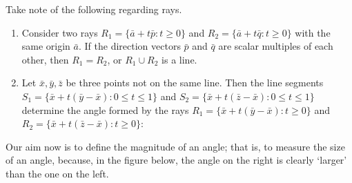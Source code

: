 \begin{remarkbox}
    Take note of the following regarding rays.

    \begin{enumerate}
        \item Consider two rays \(R_1 = \{\bar{a} + t\bar{p} : t \geq 0\}\) and \(R_2 = \{\bar{a} + t\bar{q} : t \geq 0\}\) with the same
origin \(\bar{a}\). If the direction vectors \(\bar{p}\) and \(\bar{q}\) are scalar multiples of each other, then \(R_1 = R_2\), or \(R_1 \cup R_2\) is a line.

        \item Let \(\bar{x}, \bar{y}, \bar{z}\) be three points not on the same line. Then the line segments \\
            \(S_1 = \{\bar{x}+t(\bar{y}-\bar{x}) : 0 \leq t \leq 1\}\) and \(S_2 = \{\bar{x}+t(\bar{z}-\bar{x}) : 0 \leq t \leq 1\}\) determine the angle formed by the rays 
            \(R_1 =\{\bar{x}+t(\bar{y}-\bar{x}): t \geq 0\}\) and \(R_2 =\{\bar{x}+t(\bar{z}-\bar{x}): t \geq 0\}\):
        \begin{center}
\end{center}  
        
    \end{enumerate}
\end{remarkbox}

\newpage

Our aim now is to define the magnitude of an angle; that is, to measure the size of an angle, 
because, in the figure below, the angle on the right is clearly `larger' than the one on the left.

